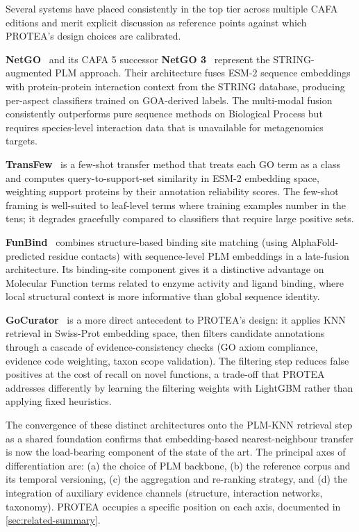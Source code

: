 Several systems have placed consistently in the top tier across multiple CAFA
editions and merit explicit discussion as reference points against which PROTEA's
design choices are calibrated.

\textbf{NetGO}~\cite{you2019netgo} and its CAFA 5 successor
\textbf{NetGO 3}~\cite{you2023netgo3} represent the STRING-augmented PLM approach.
Their architecture fuses ESM-2 sequence embeddings with protein-protein interaction
context from the STRING database, producing per-aspect classifiers trained on
GOA-derived labels. The multi-modal fusion consistently outperforms pure sequence
methods on Biological Process but requires species-level interaction data that is
unavailable for metagenomics targets.

\textbf{TransFew}~\cite{transfew2024} is a few-shot transfer method that treats
each GO term as a class and computes query-to-support-set similarity in ESM-2
embedding space, weighting support proteins by their annotation reliability
scores. The few-shot framing is well-suited to leaf-level terms where training
examples number in the tens; it degrades gracefully compared to classifiers that
require large positive sets.

\textbf{FunBind}~\cite{funbind2023} combines structure-based binding site
matching (using AlphaFold-predicted residue contacts) with sequence-level PLM
embeddings in a late-fusion architecture. Its binding-site component gives it a
distinctive advantage on Molecular Function terms related to enzyme activity and
ligand binding, where local structural context is more informative than global
sequence identity.

\textbf{GoCurator}~\cite{gocurator2024} is a more direct antecedent to PROTEA's
design: it applies KNN retrieval in Swiss-Prot embedding space, then filters
candidate annotations through a cascade of evidence-consistency checks (GO axiom
compliance, evidence code weighting, taxon scope validation). The filtering step
reduces false positives at the cost of recall on novel functions, a trade-off
that PROTEA addresses differently by learning the filtering weights with LightGBM
rather than applying fixed heuristics.

The convergence of these distinct architectures onto the PLM-KNN retrieval step
as a shared foundation confirms that embedding-based nearest-neighbour transfer
is now the load-bearing component of the state of the art. The principal axes of
differentiation are: (a) the choice of PLM backbone, (b) the reference corpus
and its temporal versioning, (c) the aggregation and re-ranking strategy, and
(d) the integration of auxiliary evidence channels (structure, interaction
networks, taxonomy). PROTEA occupies a specific position on each axis,
documented in \cref{sec:related-summary}.

